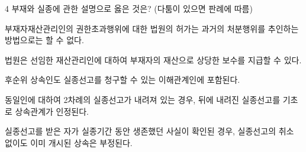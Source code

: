 \begin{question}{4}
부재와 실종에 관한 설명으로 옳은 것은? (다툼이 있으면 판례에 따름)
\begin{choices}
  \item 부재자재산관리인의 권한초과행위에 대한 법원의 허가는 과거의 처분행위를 추인하는 방법으로는 할 수 없다.
  \item 법원은 선임한 재산관리인에 대하여 부재자의 재산으로 상당한 보수를 지급할 수 있다.
  \item 후순위 상속인도 실종선고를 청구할 수 있는 이해관계인에 포함된다.
  \item 동일인에 대하여 2차례의 실종선고가 내려져 있는 경우, 뒤에 내려진 실종선고를 기초로 상속관계가 인정된다.
  \item 실종선고를 받은 자가 실종기간 동안 생존했던 사실이 확인된 경우, 실종선고의 취소 없이도 이미 개시된 상속은 부정된다.
\end{choices}
\end{question}
